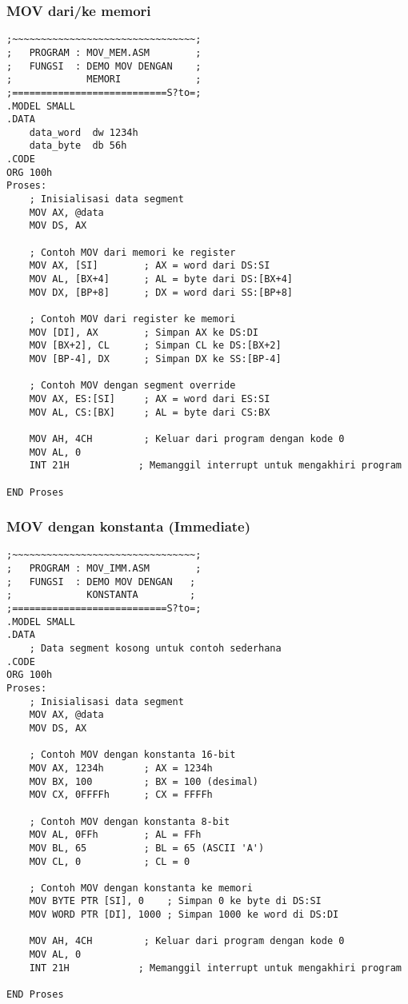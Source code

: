 \documentclass[../main.tex]{subfiles}
\begin{document}
            \subsubsection{MOV dari/ke memori}
\begin{lstlisting}[language={[x86masm]Assembler}, caption=MOV dengan Memori, label={lst:mov-memory}]
;~~~~~~~~~~~~~~~~~~~~~~~~~~~~~~~~;
;   PROGRAM : MOV_MEM.ASM        ;
;   FUNGSI  : DEMO MOV DENGAN    ;
;             MEMORI             ;
;===========================S?to=;
.MODEL SMALL
.DATA
    data_word  dw 1234h
    data_byte  db 56h
.CODE
ORG 100h
Proses:
    ; Inisialisasi data segment
    MOV AX, @data
    MOV DS, AX
    
    ; Contoh MOV dari memori ke register
    MOV AX, [SI]        ; AX = word dari DS:SI
    MOV AL, [BX+4]      ; AL = byte dari DS:[BX+4]
    MOV DX, [BP+8]      ; DX = word dari SS:[BP+8]
    
    ; Contoh MOV dari register ke memori
    MOV [DI], AX        ; Simpan AX ke DS:DI
    MOV [BX+2], CL      ; Simpan CL ke DS:[BX+2]
    MOV [BP-4], DX      ; Simpan DX ke SS:[BP-4]
    
    ; Contoh MOV dengan segment override
    MOV AX, ES:[SI]     ; AX = word dari ES:SI
    MOV AL, CS:[BX]     ; AL = byte dari CS:BX
    
    MOV AH, 4CH         ; Keluar dari program dengan kode 0
    MOV AL, 0
    INT 21H            ; Memanggil interrupt untuk mengakhiri program

END Proses
\end{lstlisting}

            \subsubsection{MOV dengan konstanta (Immediate)}
\begin{lstlisting}[language={[x86masm]Assembler}, caption=MOV dengan Konstanta, label={lst:mov-immediate}]
;~~~~~~~~~~~~~~~~~~~~~~~~~~~~~~~~;
;   PROGRAM : MOV_IMM.ASM        ;
;   FUNGSI  : DEMO MOV DENGAN   ;
;             KONSTANTA         ;
;===========================S?to=;
.MODEL SMALL
.DATA
    ; Data segment kosong untuk contoh sederhana
.CODE
ORG 100h
Proses:
    ; Inisialisasi data segment
    MOV AX, @data
    MOV DS, AX
    
    ; Contoh MOV dengan konstanta 16-bit
    MOV AX, 1234h       ; AX = 1234h
    MOV BX, 100         ; BX = 100 (desimal)
    MOV CX, 0FFFFh      ; CX = FFFFh
    
    ; Contoh MOV dengan konstanta 8-bit
    MOV AL, 0FFh        ; AL = FFh
    MOV BL, 65          ; BL = 65 (ASCII 'A')
    MOV CL, 0           ; CL = 0
    
    ; Contoh MOV dengan konstanta ke memori
    MOV BYTE PTR [SI], 0    ; Simpan 0 ke byte di DS:SI
    MOV WORD PTR [DI], 1000 ; Simpan 1000 ke word di DS:DI
    
    MOV AH, 4CH         ; Keluar dari program dengan kode 0
    MOV AL, 0
    INT 21H            ; Memanggil interrupt untuk mengakhiri program

END Proses
\end{lstlisting}
\end{document}
